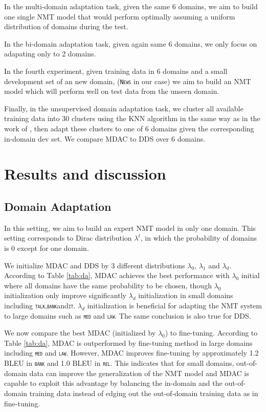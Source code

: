\documentclass[11pt]{article}
\newcommand{\domain}[1]{\texttt{\textsc{#1}}}
\begin{document}
In the multi-domain adaptation task, given the same 6 domains, we aim to build one single NMT model that would perform optimally assuming a uniform distribution of domains during the test.

In the bi-domain adaptation task, given again same 6 domains, we only focus on adapating only to 2 domains.

In the fourth experiment, given training data in 6 domains and a small development set of an new domain, (\domain{News} in our case) we aim to build an NMT model which will perform well on test data from the unseen domain.

Finally, in the unsupervised domain adaptation task, we cluster all available training data into 30 clusters using the KNN algorithm in the same way as in the work of \citet{Tars18multidomain}, then adapt these clusters to one of 6 domains given the corresponding in-domain dev set. We compare MDAC to DDS over 6 domains.

\section{Results and discussion \label{sec:results}}

\subsection{Domain Adaptation}\label{ssec:da}
In this setting, we aim to build an expert NMT model in only one domain. This setting corresponds to Dirac distribution $\lambda^t$, in which the probability of domains is 0 except for one domain.

We initialize MDAC and DDS by 3 different distributions $\lambda_0$, $\lambda_1$ and $\lambda_d$. According to Table \ref{tab:da}, MDAC achieves the best performance with $\lambda_0$ initial where all domains have the same probability to be chosen, though $\lambda_0$  initialization only improve significantly $\lambda_d$ initialization in small domains including \domain{talk},\domain{bank}and\domain{it}. $\lambda_d$ initialization is beneficial for adapting the NMT system to large domains such as \domain{med} and \domain{law}. The same conclusion is also true for DDS. 

We now compare the best MDAC (initialized by $\lambda_0$) to fine-tuning. According to Table \ref{tab:da}, MDAC is outperformed by fine-tuning method in large domains including \domain{med} and \domain{law}. However, MDAC improves fine-tuning by approximately 1.2 BLEU in \domain{bank} and 1.0 BLEU in \domain{rel}. This indicates that for small domains, out-of-domain data can improve the generalization of the NMT model and MDAC is capable to exploit this advantage by balancing the in-domain and the out-of-domain training data instead of edging out the out-of-domain training data as in fine-tuning.
\end{document}
